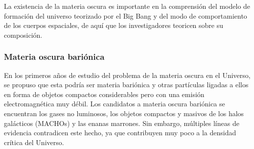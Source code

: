 La existencia de la materia oscura es importante en la comprensión del modelo de formación del universo teorizado por el Big Bang y del modo de comportamiento de los cuerpos espaciales, de aquí que los investigadores teoricen sobre su composición. %
%
%

\subsubsection{Materia oscura bariónica }
En los primeros a\~nos de estudio del problema de la materia oscura en el Universo, se propuso que esta podría ser materia bariónica y otras partículas ligadas a ellos en forma de objetos compactos considerables pero con una emisión electromagnética muy débil. Los candidatos a materia oscura bariónica se encuentran los gases no luminosos, los objetos compactos y masivos de los halos galácticos (MACHOs) y las enanas marrones.
Sin embargo, múltiples líneas de evidencia contradicen este hecho, ya que contribuyen muy poco a la densidad crítica del
Universo.

